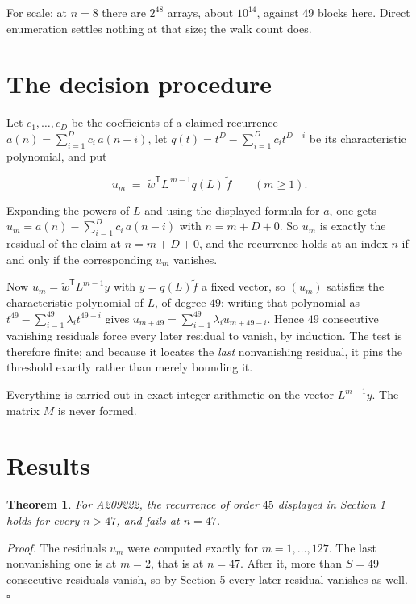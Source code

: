 \documentclass[11pt]{article}
\newtheorem{theorem}{Theorem}
\theoremstyle{definition}
\begin{document}
For scale: at $n = 8$ there are $2^{48}$ arrays, about $10^{14}$, against $49$ blocks here. Direct enumeration settles nothing at that size; the walk count does.

\section{The decision procedure}

Let $c_1,\dots,c_D$ be the coefficients of a claimed recurrence $a(n) = \sum_{i=1}^{D} c_i\,a(n-i)$, let $q(t) = t^{D} - \sum_{i=1}^{D} c_i t^{D-i}$ be its characteristic polynomial, and put

\[u_m \;=\; \tilde w^{\mathsf T} L^{\,m-1} q(L)\,\tilde f \qquad (m \ge 1).\]

Expanding the powers of $L$ and using the displayed formula for $a$, one gets $u_m = a(n) - \sum_{i=1}^{D} c_i\,a(n-i)$ with $n = m + D + 0$. So $u_m$ is exactly the residual of the claim at $n = m + D + 0$, and the recurrence holds at an index $n$ if and only if the corresponding $u_m$ vanishes.

Now $u_m = \tilde w^{\mathsf T} L^{m-1} y$ with $y = q(L)\tilde f$ a fixed vector, so $(u_m)$ satisfies the characteristic polynomial of $L$, of degree $49$: writing that polynomial as $t^{49} - \sum_{i=1}^{49} \lambda_i t^{49-i}$ gives $u_{m+49} = \sum_{i=1}^{49} \lambda_i u_{m+49-i}$. Hence $49$ consecutive vanishing residuals force every later residual to vanish, by induction. The test is therefore finite; and because it locates the {\itshape last} nonvanishing residual, it pins the threshold exactly rather than merely bounding it.

Everything is carried out in exact integer arithmetic on the vector $L^{m-1}y$. The matrix $M$ is never formed.

\section{Results}

\begin{theorem} For A209222, the recurrence of order $45$ displayed in Section 1 holds for every $n > 47$, and fails at $n = 47$.\end{theorem}

{\itshape Proof.} The residuals $u_m$ were computed exactly for $m = 1,\dots,127$. The last nonvanishing one is at $m = 2$, that is at $n = 47$. After it, more than $S = 49$ consecutive residuals vanish, so by Section 5 every later residual vanishes as well. $\square$
\end{document}
